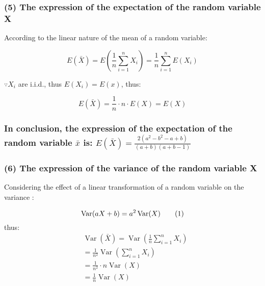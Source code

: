 \documentclass[
]{article}
\begin{document}
\subsubsection{(5) The expression of the expectation of the random
variable
X}\label{the-expression-of-the-expectation-of-the-random-variable-x}

According to the linear nature of the mean of a random variable:

\[
\begin{equation}
E(\bar{X})=E\left(\frac{1}{n} \sum_{i=1}^{n} X_{i}\right)=\frac{1}{n} \sum_{i=1}^{n} E\left(X_{i}\right) \tag{1}
\end{equation}
\]

\(\because X_{i}\) are i.i.d., thus \(E\left(X_{i}\right)=E(x)\), thus:

\[
\begin{equation}
E(\bar{X})=\frac{1}{n} \cdot n \cdot E(X)=E(X) \tag{2} 
\end{equation}
\]

\subsubsection{\texorpdfstring{In conclusion, the expression of the
expectation of the random variable \(\bar{x}\) is:
\(E(\bar{X})=\frac{2\left(a^{2}-b^{2}-a+b\right)}{(a+b)(a+b-1)}\)}{In conclusion, the expression of the expectation of the random variable \textbackslash bar\{x\} is: E(\textbackslash bar\{X\})=\textbackslash frac\{2\textbackslash left(a\^{}\{2\}-b\^{}\{2\}-a+b\textbackslash right)\}\{(a+b)(a+b-1)\}}}\label{in-conclusion-the-expression-of-the-expectation-of-the-random-variable-barx-is-ebarxfrac2lefta2-b2-abrightabab-1}

\subsubsection{(6) The expression of the variance of the random variable
X}\label{the-expression-of-the-variance-of-the-random-variable-x}

Considering the effect of a linear transformation of a random variable
on the variance :

\[
\begin{equation}
\operatorname{Var}(a X+b)=a^{2} \operatorname{Var}(X)  \tag{1}\\
\end{equation}
\] thus: \[
\begin{align*}
&\operatorname{Var}(\bar{X})=\operatorname{Var}\left(\frac{1}{n} \sum_{i=1}^{n} X_{i}\right) \\
&=\frac{1}{n^{2}} \operatorname{Var}\left(\sum_{i=1}^{n} X_{i}\right) \\
&=\frac{1}{n^{2}} \cdot n \operatorname{Var}(X) \\
&=\frac{1}{n} \operatorname{Var}(X) \tag{2}
\end{align*}
\]
\end{document}
